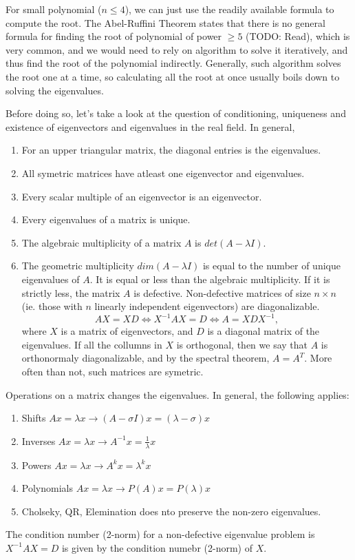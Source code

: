 \documentclass[5pt, a4paper]{article}
\begin{document}
    For small polynomial ($n \le 4$), we can just use the readily available
    formula to compute the root. The Abel-Ruffini Theorem states that there is
    no general formula for finding the root of polynomial of power $\ge  5$
    (TODO: Read), which is very common, and we would need to rely on algorithm
    to solve it iteratively, and thus find the root of the polynomial
    indirectly. Generally, such algorithm solves the root one at a time, so
    calculating all the root at once usually boils down to solving the
    eigenvalues. 

    Before doing so, let's take a look at the question of conditioning, uniqueness and
    existence of eigenvectors and eigenvalues in the real field. In general, 
    \begin{enumerate}
        \item For an upper triangular matrix, the diagonal entries is the
            eigenvalues.
        \item All symetric matrices have atleast one eigenvector and
            eigenvalues.
        \item Every scalar multiple of an eigenvector is an eigenvector.
        \item Every eigenvalues of a matrix is unique.
         \item The algebraic multiplicity of a matrix $A$ is $det(A - \lambda I)$.
        \item The geometric multiplicity $dim(A - \lambda I)$ is equal to the
            number of unique eigenvalues of  $A$. It is equal or less than the
            algebraic multiplicity. If it is strictly less, the matrix $A$ is
            defective. Non-defective matrices of size $n\times n$ (ie. those with
            $n$ linearly independent eigenvectors) are diagonalizable. \[
                AX = XD \iff X^{-1} A X = D \iff A = XDX^{-1}
            ,\] 
            where $X$ is a matrix of eigenvectors, and $D$ is a diagonal matrix
            of the eigenvalues. If all the collumns in $X$ is orthogonal, then
            we say that $A$ is orthonormaly diagonalizable, and by the spectral
            theorem, $A = A^T$. More often than not, such matrices are symetric.
    \end{enumerate}

    Operations on a matrix changes the eigenvalues. In general, the following
    applies: 
    \begin{enumerate}
        \item Shifts $Ax = \lambda x \to (A- \sigma I)x = (\lambda -\sigma)x $
        \item Inverses $Ax = \lambda x \to  A^{-1}x = \frac{1}{\lambda}x$
        \item Powers $Ax = \lambda x \to A^k x = \lambda^k x$
        \item Polynomials $Ax = \lambda x \to P(A)x = P(\lambda)x$
        \item Cholseky, QR, Elemination does nto preserve the non-zero
            eigenvalues.
    \end{enumerate}
    The condition number (2-norm) for a non-defective eigenvalue problem is
    $X^{-1} A X = D$ is given by the condition numebr (2-norm) of $X$.
\end{document}
